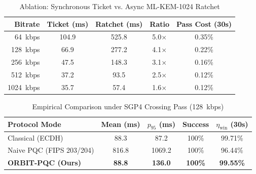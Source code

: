 \begin{table}[t]
\centering
\caption{Ablation: Synchronous Ticket vs. Async ML-KEM-1024 Ratchet}
\label{tab:ablation_summary}
\begin{tabular}{rcccc}
\toprule
\textbf{Bitrate} & \textbf{Ticket (ms)} & \textbf{Ratchet (ms)} & \textbf{Ratio} & \textbf{Pass Cost (30s)} \\
\midrule
64~kbps & 104.9 & 525.8 & 5.0$\times$ & 0.35\% \\
128~kbps & 66.9 & 277.2 & 4.1$\times$ & 0.22\% \\
256~kbps & 47.5 & 148.3 & 3.1$\times$ & 0.16\% \\
512~kbps & 37.2 & 93.5 & 2.5$\times$ & 0.12\% \\
1024~kbps & 35.7 & 57.4 & 1.6$\times$ & 0.12\% \\
\bottomrule
\end{tabular}
\end{table}

\begin{table}[t]
\centering
\caption{Empirical Comparison under SGP4 Crossing Pass (128~kbps)}
\label{tab:sgp4_summary}
\begin{tabular}{lcccc}
\toprule
\textbf{Protocol Mode} & \textbf{Mean (ms)} & \textbf{$p_{95}$ (ms)} & \textbf{Success} & \textbf{$\eta_{\text{win}}$ (30s)} \\
\midrule
Classical (ECDH) & 88.3 & 87.2 & 100\% & 99.71\% \\
Naive PQC (FIPS 203/204) & 816.8 & 1069.2 & 100\% & 96.44\% \\
\textbf{ORBIT-PQC (Ours)} & \textbf{88.8} & \textbf{136.0} & \textbf{100\%} & \textbf{99.55\%} \\
\bottomrule
\end{tabular}
\end{table}

